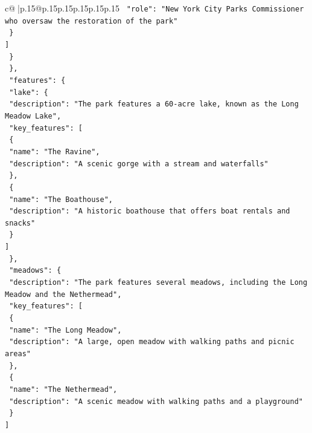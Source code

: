 \documentclass{article}
\begin{document}
{\begin{supertabular}{c@{$\;$}|p{.15\linewidth}@{}p{.15\linewidth}p{.15\linewidth}p{.15\linewidth}p{.15\linewidth}p{.15\linewidth}}
{{{\texttt{          "role": "New York City Parks Commissioner who oversaw the restoration of the park"} \\
\texttt{        \}} \\
\texttt{      {]}} \\
\texttt{    \}} \\
\texttt{  \},} \\
\texttt{  "features": \{} \\
\texttt{    "lake": \{} \\
\texttt{      "description": "The park features a 60{-}acre lake, known as the Long Meadow Lake",} \\
\texttt{      "key\_features": {[}} \\
\texttt{        \{} \\
\texttt{          "name": "The Ravine",} \\
\texttt{          "description": "A scenic gorge with a stream and waterfalls"} \\
\texttt{        \},} \\
\texttt{        \{} \\
\texttt{          "name": "The Boathouse",} \\
\texttt{          "description": "A historic boathouse that offers boat rentals and snacks"} \\
\texttt{        \}} \\
\texttt{      {]}} \\
\texttt{    \},} \\
\texttt{    "meadows": \{} \\
\texttt{      "description": "The park features several meadows, including the Long Meadow and the Nethermead",} \\
\texttt{      "key\_features": {[}} \\
\texttt{        \{} \\
\texttt{          "name": "The Long Meadow",} \\
\texttt{          "description": "A large, open meadow with walking paths and picnic areas"} \\
\texttt{        \},} \\
\texttt{        \{} \\
\texttt{          "name": "The Nethermead",} \\
\texttt{          "description": "A scenic meadow with walking paths and a playground"} \\
\texttt{        \}} \\
\texttt{      {]}} \\
}}}
\end{supertabular}}
\end{document}
